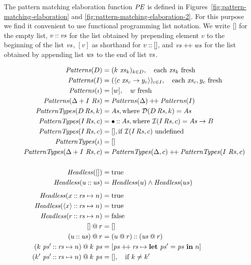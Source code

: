 \documentclass[11pt]{article}
\newcommand{\key}[1]{\textbf{#1}} %
\newcommand{\handleSymbol}{\rightarrow}
\newcommand{\handle}[2]{{#1} \handleSymbol {#2}}
\newcommand{\effin}[1]{\langle {#1} \rangle}
\newcommand{\id}{\iota}
\begin{document}
The pattern matching elaboration function $\mathit{PE}$ is defined in
Figures~\ref{fig:pattern-matching-elaboration} and \ref{fig:pattern-matching-elaboration-2}. For this purpose we
find it convenient to use functional programming list notation. We
write $[]$ for the empty list, $v \mathbin{::} \mathit{vs}$ for the list
obtained by prepending element $v$ to the beginning of the list $\mathit{vs}$,
$[v]$ as shorthand for $v \mathbin{::} []$, and $\mathit{vs} \mathbin{+\!+} \mathit{ws}$ for
the list obtained by appending list $\mathit{ws}$ to the end of list $\mathit{vs}$.
%
\begin{figure*}
\small
\begin{align*}
\Patterns(D) &= (k~\xs_k)_{k \in D},  \quad \text{each }\xs_k \text{ fresh} \\
\Patterns(I) &= (\effin{\handle{c~\xs_c}{y_c}})_{c \in I}, \quad \text{each }\xs_c, y_c \text{ fresh} \\
\Patterns(\id) &= [w], \quad w \text{ fresh} \\
\Patterns(\Delta + I~\Rs) &= \Patterns(\Delta) \concat \Patterns(I) \\
\PatternTypes(D\,\Rs, k) &= \As,  \text{where }\dcon(D\,\Rs, k) = \As \\
\PatternTypes(I\,\Rs, c) &= \bullet \cons \As,    \text{where }\icom(I\,\Rs, c) = \As \to B \\
\PatternTypes(I\,\Rs, c) &= [],  \text{if }\icom(I\,\Rs, c)\text{ undefined} \\
\PatternTypes(\id) &= \emptylist \\
\PatternTypes(\Delta + I~\Rs, c) &= 
\PatternTypes(\Delta, c) \concat \PatternTypes(I~\Rs, c) \\
\\
\hdless(\emptylist) &= \true\\
  \hdless(u \cons \us) &= \hdless(u) \wedge \hdless(us)\\[1ex]
  \hdless(x \cons \rs \mapsto n) &= \true\\
  \hdless(\effin{x} \cons \rs \mapsto n) &= \true\\
  \hdless(r \cons \rs \mapsto n) &= \false\\
   \emptylist \proj r &= \emptylist \\
(u \cons \us) \proj r &= (u \proj r) \cons (\us \proj r) \\
(k~\ps' \cons \rs \mapsto n) \proj k~\ps &=
        [\ps \concat \rs \mapsto \key{let}~\ps' = \ps~\key{in}~n] \\
(k'~\ps' \cons \rs \mapsto n) \proj k~\ps &= [], \quad \text{if }k \neq k'\\

\end{align*}
\end{figure*}
\end{document}
